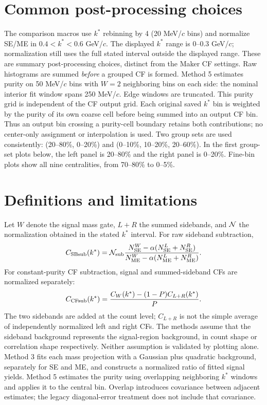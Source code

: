 \documentclass[11pt,a4paper]{article}
\begin{document}
\section{Common post-processing choices}
The comparison macros use $k^*$ rebinning by 4 (20 MeV/$c$ bins) and normalize SE/ME in $0.4<k^*<0.6$ GeV/$c$. The displayed $k^*$ range is $0$--$0.3$ GeV/$c$; normalization still uses the full stated interval outside the displayed range. These are summary post-processing choices, distinct from the Maker CF settings. Raw histograms are summed \emph{before} a grouped CF is formed.
Method 5 estimates purity on 50 MeV/$c$ bins with $W=2$ neighboring bins on each side: the nominal interior fit window spans 250 MeV/$c$. Edge windows are truncated. This purity grid is independent of the CF output grid. Each original saved $k^*$ bin is weighted by the purity of its own coarse cell before being summed into an output CF bin. Thus an output bin crossing a purity-cell boundary retains both contributions; no center-only assignment or interpolation is used.
Two group sets are used consistently: (20--80\%, 0--20\%) and (0--10\%, 10--20\%, 20--60\%). In the first group-set plots below, the left panel is 20--80\% and the right panel is 0--20\%. Fine-bin plots show all nine centralities, from 70--80\% to 0--5\%.
\clearpage\section{Definitions and limitations}
Let $W$ denote the signal mass gate, $L+R$ the summed sidebands, and ${\cal N}$ the normalization obtained in the stated $k^*$ interval. For raw sideband subtraction,
\begin{equation}C_{\rm SBsub}(k^*)={\cal N}_{\rm sub}\frac{N_{\rm SE}^{W}-\alpha(N_{\rm SE}^{L}+N_{\rm SE}^{R})}{N_{\rm ME}^{W}-\alpha(N_{\rm ME}^{L}+N_{\rm ME}^{R})}.\end{equation}
For constant-purity CF subtraction, signal and summed-sideband CFs are normalized separately:
\begin{equation}C_{\rm CFsub}(k^*)=\frac{C_W(k^*)-(1-P)C_{L+R}(k^*)}{P}.\end{equation}
The two sidebands are added at the count level; $C_{L+R}$ is not the simple average of independently normalized left and right CFs. The methods assume that the sideband background represents the signal-region background, in count shape or correlation shape respectively. Neither assumption is validated by plotting alone.
Method 3 fits each mass projection with a Gaussian plus quadratic background, separately for SE and ME, and constructs a normalized ratio of fitted signal yields. Method 5 estimates the purity using overlapping neighboring $k^*$ windows and applies it to the central bin. Overlap introduces covariance between adjacent estimates; the legacy diagonal-error treatment does not include that covariance.
\end{document}
